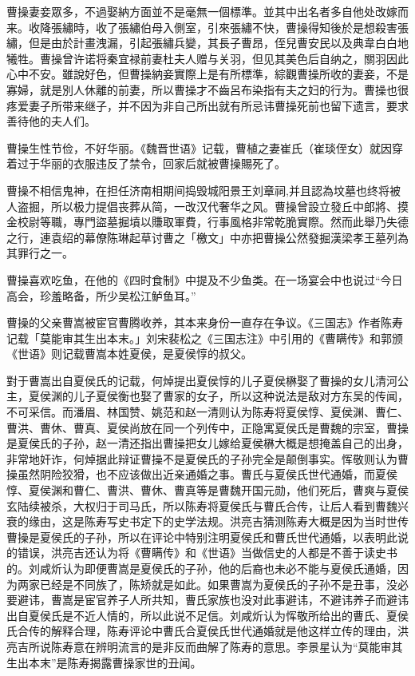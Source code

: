 曹操妻妾眾多，不過娶納方面並不是毫無一個標準。並其中出名者多自他处改嫁而来。收降張繡時，收了張繡伯母入側室，引來張繡不快，曹操得知後於是想殺害張繡，但是由於計畫洩漏，引起張繡兵變，其長子曹昂，侄兒曹安民以及典韋白白地犧牲。曹操曾许诺将秦宜禄前妻杜夫人赠与关羽，但见其美色后自纳之，關羽因此心中不安。雖說好色，但曹操納妾實際上是有所標準，綜觀曹操所收的妻妾，不是寡婦，就是別人休離的前妻，所以曹操才不齒呂布染指有夫之妇的行为。曹操也很疼爱妻子所带来继子，并不因为非自己所出就有所忌讳曹操死前也留下遗言，要求善待他的夫人们。

曹操生性节俭，不好华丽。《魏晋世语》记载，曹植之妻崔氏（崔琰侄女）就因穿着过于华丽的衣服违反了禁令，回家后就被曹操賜死了。

曹操不相信鬼神，在担任济南相期间捣毁城阳景王刘章祠,并且認為坟墓也终将被人盗掘，所以极力提倡丧葬从简，一改汉代奢华之风。曹操曾設立發丘中郎將、摸金校尉等職，專門盜墓掘墳以賺取軍費，行事風格非常乾脆實際。然而此舉乃失德之行，連袁绍的幕僚陈琳起草讨曹之「檄文」中亦把曹操公然發掘漢梁孝王墓列為其罪行之一。

曹操喜欢吃鱼，在他的《四时食制》中提及不少鱼类。在一场宴会中也说过“今日高会，珍羞略备，所少吴松江鲈鱼耳。”

曹操的父亲曹嵩被宦官曹腾收养，其本来身份一直存在争议。《三国志》作者陈寿记载「莫能审其生出本末。」刘宋裴松之《三国志注》中引用的《曹瞒传》和郭颁《世语》则记载曹嵩本姓夏侯，是夏侯惇的叔父。

對于曹嵩出自夏侯氏的记载，何焯提出夏侯惇的儿子夏侯楙娶了曹操的女儿清河公主，夏侯渊的儿子夏侯衡也娶了曹家的女子，所以这种说法是敌对方东吴的传闻，不可采信。而潘眉、林国赞、姚范和赵一清则认为陈寿将夏侯惇、夏侯渊、曹仁、曹洪、曹休、曹真、夏侯尚放在同一个列传中，正隐寓夏侯氏是曹魏的宗室，曹操是夏侯氏的子孙，赵一清还指出曹操把女儿嫁给夏侯楙大概是想掩盖自己的出身，非常地奸诈，何焯据此辩证曹操不是夏侯氏的子孙完全是颠倒事实。恽敬则认为曹操虽然阴险狡猾，也不应该做出近亲通婚之事。曹氏与夏侯氏世代通婚，而夏侯惇、夏侯渊和曹仁、曹洪、曹休、曹真等是曹魏开国元勋，他们死后，曹爽与夏侯玄陆续被杀，大权归于司马氏，所以陈寿将夏侯氏与曹氏合传，让后人看到曹魏兴衰的缘由，这是陈寿写史书定下的史学法规。洪亮吉猜测陈寿大概是因为当时世传曹操是夏侯氏的子孙，所以在评论中特别注明夏侯氏和曹氏世代通婚，以表明此说的错误，洪亮吉还认为将《曹瞒传》和《世语》当做信史的人都是不善于读史书的。刘咸炘认为即便曹嵩是夏侯氏的子孙，他的后裔也未必不能与夏侯氏通婚，因为两家已经是不同族了，陈矫就是如此。如果曹嵩为夏侯氏的子孙不是丑事，没必要避讳，曹嵩是宦官养子人所共知，曹氏家族也没对此事避讳，不避讳养子而避讳出自夏侯氏是不近人情的，所以此说不足信。刘咸炘认为恽敬所给出的曹氏、夏侯氏合传的解释合理，陈寿评论中曹氏合夏侯氏世代通婚就是他这样立传的理由，洪亮吉所说陈寿意在辨明流言的是非反而曲解了陈寿的意思。李景星认为“莫能审其生出本末”是陈寿揭露曹操家世的丑闻。

